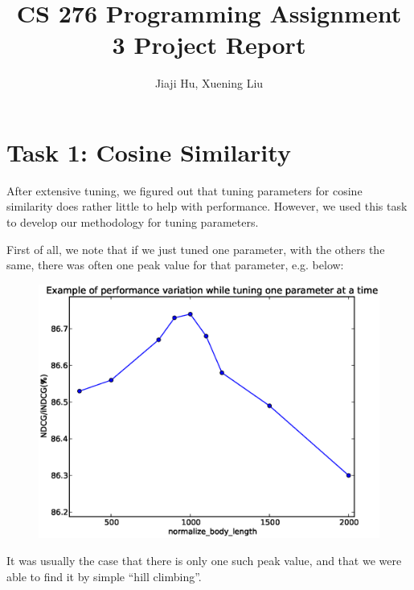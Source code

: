 \documentclass[10pt,twocolumn]{article}
\begin{document}
\title{CS 276 Programming Assignment 3 Project Report}
\author{Jiaji Hu, Xuening Liu}
\date{}
\maketitle

\section*{Task 1: Cosine Similarity}
After extensive tuning, we figured out that tuning parameters for cosine similarity does rather little to help with performance. However, we used this task to develop our methodology for tuning parameters.

First of all, we note that if we just tuned one parameter, with the others the same, there was often one peak value for that parameter, e.g. below:
\begin{figure}[H]
\centering
\includegraphics[width=0.6\linewidth]{fig1}
\end{figure}
It was usually the case that there is only one such peak value, and that we were able to find it by simple ``hill climbing''.
\end{document}
